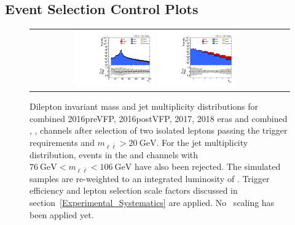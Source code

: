 \subsection{Event Selection Control Plots}
\begin{figure}[htb]
    \begin{center}
        \begin{tabular}{cc}
            \includegraphics[width=0.325\textwidth]{fig_fullRun2UL/controlplots/combined/DIMFull.pdf}
            \includegraphics[width=0.325\textwidth]{fig_fullRun2UL/controlplots/combined/HypjetMulti_diLep.pdf}
        \end{tabular}
        \caption{\footnotesize Dilepton invariant mass and jet multiplicity distributions for combined 2016preVFP, 2016postVFP, 2017, 2018 eras and combined \ee, \emu, \mumu channels after selection of two isolated leptons passing the trigger requirements and $m_{\ell\bar{\ell}} > \SI{20}{\GeV}$.
        For the jet multiplicity distribution, events in the \ee and \mumu channels with $\SI{76}{\GeV} < m_{\ell\bar{\ell}} < \SI{106}{\GeV}$ have also been rejected.
        The simulated samples are re-weighted to an integrated luminosity of \lumivalueRuniiUL.
        Trigger efficiency and lepton selection scale factors discussed in section~\ref{Experimental_Systematics} are applied.
        No \zjets\ scaling has been applied yet.
        }
    \end{center}
\end{figure}

